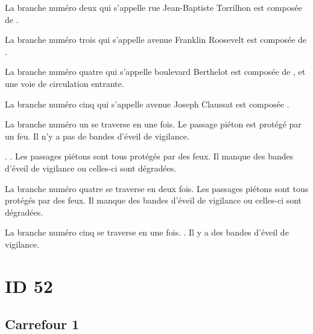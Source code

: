 \begin{appendix}
La branche numéro deux qui s'appelle rue Jean-Baptiste Torrilhon est composée de .

\newpar{}

La branche numéro trois qui s'appelle avenue Franklin Roosevelt est composée de .

\newpar{}

La branche numéro quatre qui s'appelle boulevard Berthelot est composée de , et une voie de circulation entrante.

\newpar{}

La branche numéro cinq qui s'appelle avenue Joseph Claussat est composée .

\newpar{}

La branche numéro un se traverse en une fois. Le passage piéton est protégé par un feu. Il n'y a pas de bandes d'éveil de vigilance.

\newpar{}

. . Les passages piétons sont tous protégés par des feux. Il manque des bandes d'éveil de vigilance ou celles-ci sont dégradées.

\newpar{}

La branche numéro quatre se traverse en deux fois. Les passages piétons sont tous protégés par des feux. Il manque des bandes d'éveil de vigilance ou celles-ci sont dégradées.

\newpar{}

La branche numéro cinq se traverse en une fois.  . Il y a des bandes d'éveil de vigilance.

\section*{ID 52}

\label{annexe:q_ID52}

\subsection*{Carrefour 1}


\end{appendix}
